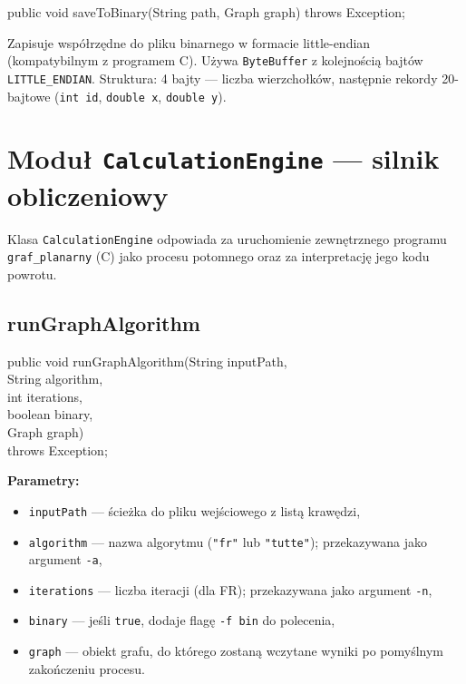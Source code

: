 \documentclass[a4paper, 11pt]{article}
\begin{document}
\begin{cmdbox}
public void saveToBinary(String path, Graph graph) throws Exception;
\end{cmdbox}

Zapisuje współrzędne do pliku binarnego w formacie little-endian
(kompatybilnym z programem C). Używa \texttt{ByteBuffer} z kolejnością
bajtów \texttt{LITTLE\_ENDIAN}. Struktura: 4 bajty --- liczba
wierzchołków, następnie rekordy 20-bajtowe (\texttt{int id},
\texttt{double x}, \texttt{double y}).

\section{Moduł \texttt{CalculationEngine} --- silnik obliczeniowy}

Klasa \texttt{CalculationEngine} odpowiada za uruchomienie zewnętrznego
programu \texttt{graf\_planarny} (C) jako procesu potomnego oraz za
interpretację jego kodu powrotu.

\subsection{runGraphAlgorithm}

\begin{cmdbox}
public void runGraphAlgorithm(String inputPath,\\
\quad\qquad\qquad\qquad\qquad\; String algorithm,\\
\quad\qquad\qquad\qquad\qquad\; int iterations,\\
\quad\qquad\qquad\qquad\qquad\; boolean binary,\\
\quad\qquad\qquad\qquad\qquad\; Graph graph)\\
\quad\qquad\qquad\qquad\qquad\; throws Exception;
\end{cmdbox}

\textbf{Parametry:}
\begin{itemize}
  \item \texttt{inputPath} --- ścieżka do pliku wejściowego z listą krawędzi,
  \item \texttt{algorithm} --- nazwa algorytmu (\texttt{"fr"} lub
    \texttt{"tutte"}); przekazywana jako argument \texttt{-a},
  \item \texttt{iterations} --- liczba iteracji (dla FR); przekazywana
    jako argument \texttt{-n},
  \item \texttt{binary} --- jeśli \texttt{true}, dodaje flagę
    \texttt{-f bin} do polecenia,
  \item \texttt{graph} --- obiekt grafu, do którego zostaną wczytane
    wyniki po pomyślnym zakończeniu procesu.
\end{itemize}
\end{document}

